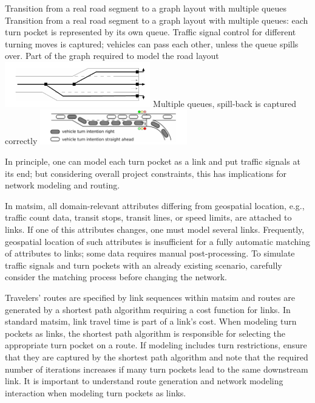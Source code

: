 \createfigure%
{Transition from a real road segment to a graph layout with multiple queues}%
{Transition from a real road segment to a graph layout with multiple queues: each turn pocket is represented by its own queue. Traffic signal control for different turning moves is captured; vehicles can pass each other, unless the queue spills over. }
{\label{fig:lanes_representation}}%
{%
  \createsubfigure%
	{Part of the graph required to model the road layout}
	{\includegraphics[width=0.475\textwidth]{extending/figures/signalslanes/link_lanes_layout}}
	{\label{fig:model_link_layout}}
  \createsubfigure%
	{Multiple queues, spill-back is captured correctly}%
	{\includegraphics[width=0.48\textwidth]{extending/figures/signalslanes/multiple_queue_model_inkscape.pdf}}%
	{\label{fig:lanes_representation_multiple_queue}}%
}%
{\citet{GretherNeumannNagel2012SignalsQueueModelABMTrans}}

In principle, one can model each turn pocket as a link and put traffic signals at its end; 
but considering overall project constraints, this has implications for network modeling and routing. 

In \gls{matsim}, all domain-relevant attributes differing from geospatial location, e.g.,\,traffic count data, transit stops, transit lines, or speed limits, are attached to links. 
If one of this attributes changes, one must model several links. 
Frequently, geospatial location of such attributes is insufficient for a fully automatic matching of attributes to links; 
some data requires manual post-processing. 
To simulate traffic signals and turn pockets with an already existing scenario, carefully consider the matching process before changing the network.  

Travelers' routes are specified by link sequences within \gls{matsim} and 
routes are generated by a shortest path algorithm requiring a cost function for links. 
In standard \gls{matsim}, link travel time is part of a link's cost.
When modeling turn pockets as links, the shortest path algorithm is responsible for selecting the appropriate turn pocket on a route.
If modeling includes turn restrictions, ensure that they are captured by the shortest path algorithm and note that 
the required number of iterations increases if many turn pockets lead to the same downstream link. 
It is important to understand route generation and network modeling interaction when modeling turn pockets as links. 

